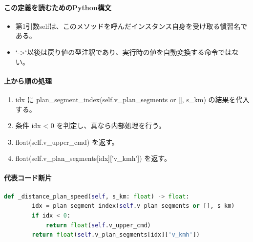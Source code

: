 \documentclass[a4paper,11pt]{article}
\begin{document}
            \paragraph{この定義を読むためのPython構文}
            \begin{itemize}[leftmargin=1.6em]
            \item 第1引数selfは、このメソッドを呼んだインスタンス自身を受け取る慣習名である。
\item `->`以後は戻り値の型注釈であり、実行時の値を自動変換する命令ではない。
            \end{itemize}
            \paragraph{上から順の処理}
            \begin{enumerate}[leftmargin=1.8em]
            \item idx に plan\_segment\_index(self.v\_plan\_segments or [], s\_km) の結果を代入する。
\item 条件 idx < 0 を判定し、真なら内部処理を行う。
\item   float(self.v\_upper\_cmd) を返す。
\item float(self.v\_plan\_segments[idx]['v\_kmh']) を返す。
            \end{enumerate}
            \paragraph{代表コード断片}
            \begin{lstlisting}[language=Python]
    def _distance_plan_speed(self, s_km: float) -> float:
        idx = plan_segment_index(self.v_plan_segments or [], s_km)
        if idx < 0:
            return float(self.v_upper_cmd)
        return float(self.v_plan_segments[idx]['v_kmh'])
\end{lstlisting}
\end{document}
